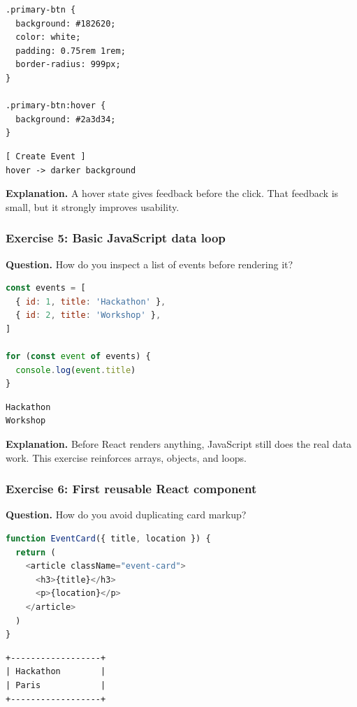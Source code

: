 \documentclass[11pt,a4paper]{article}
\begin{document}
\begin{lstlisting}[style=code]
.primary-btn {
  background: #182620;
  color: white;
  padding: 0.75rem 1rem;
  border-radius: 999px;
}

.primary-btn:hover {
  background: #2a3d34;
}
\end{lstlisting}

\begin{lstlisting}[style=terminal]
[ Create Event ]
hover -> darker background
\end{lstlisting}

\textbf{Explanation.} A hover state gives feedback before the click. That feedback is small, but it strongly improves usability.

\subsubsection*{Exercise 5: Basic JavaScript data loop}
\textbf{Question.} How do you inspect a list of events before rendering it?

\begin{lstlisting}[style=code, language=JavaScript]
const events = [
  { id: 1, title: 'Hackathon' },
  { id: 2, title: 'Workshop' },
]

for (const event of events) {
  console.log(event.title)
}
\end{lstlisting}

\begin{lstlisting}[style=terminal]
Hackathon
Workshop
\end{lstlisting}

\textbf{Explanation.} Before React renders anything, JavaScript still does the real data work. This exercise reinforces arrays, objects, and loops.

\subsubsection*{Exercise 6: First reusable React component}
\textbf{Question.} How do you avoid duplicating card markup?

\begin{lstlisting}[style=code, language=JavaScript]
function EventCard({ title, location }) {
  return (
    <article className="event-card">
      <h3>{title}</h3>
      <p>{location}</p>
    </article>
  )
}
\end{lstlisting}

\begin{lstlisting}[style=terminal]
+------------------+
| Hackathon        |
| Paris            |
+------------------+
\end{lstlisting}
\end{document}
